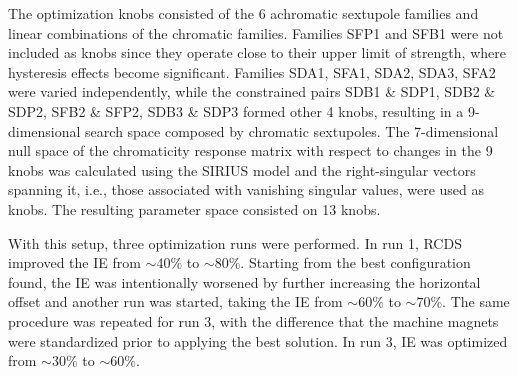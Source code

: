 \documentclass[a4paper,
               keeplastbox,   %
               ]{jacow}
\begin{document}
The optimization knobs consisted of the 6 achromatic sextupole families and linear combinations of the chromatic families. Families SFP1 and SFB1 were not included as knobs since they operate close to their upper limit of strength, where hysteresis effects become significant.  Families SDA1, SFA1, SDA2, SDA3, SFA2 were varied independently, while the constrained pairs SDB1 \& SDP1, SDB2 \& SDP2, SFB2 \& SFP2, SDB3 \& SDP3 formed other 4 knobs, resulting in a 9-dimensional search space composed by chromatic sextupoles. The 7-dimensional null space of the chromaticity response matrix with respect to changes in the 9 knobs was calculated using the SIRIUS model and the right-singular vectors spanning it, i.e., those associated with vanishing singular values, were used as knobs. The resulting parameter space consisted on 13 knobs. 

With this setup, three optimization runs were performed. In run 1, RCDS improved the IE from $\sim40\%$ to $\sim80\%$. Starting from the best configuration found, the IE was intentionally worsened by further increasing the horizontal offset and another run was started, taking the IE from $\sim60\%$ to $\sim70\%$. The same procedure was repeated for run 3, with the difference that the machine magnets were standardized prior to applying the best solution. In run 3, IE was optimized from $\sim30\%$ to $\sim60\%$.
 
\end{document}

